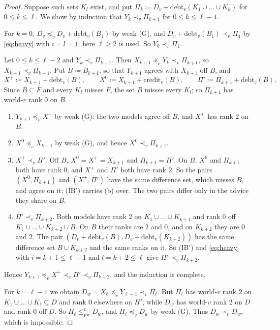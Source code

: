 \documentclass[11pt]{article}
\theoremstyle{definition}\newtheorem{definition}[theorem]{Definition}
\theoremstyle{remark}\newtheorem{remark}[theorem]{Remark}
\newcommand{\debt}{\mathrm{debt}}
\newcommand{\cred}{\mathrm{credit}}
\newcommand{\pw}{\mathrm{pw}}
\begin{document}
\begin{proof}
Suppose such sets $K_l$ exist, and put
$\Pi_k\coloneqq D_v+\debt_v(K_1\cup\dots\cup K_k)$ for $0\le k\le\ell$. We
show by induction that $Y_k\prec_v\Pi_{k+1}$ for $0\le k\le\ell-1$.

For $k=0$, $D_v\preceq_vD_v+\debt_v(B_1)$ by weak (G), and
$D_v+\debt_v(B_1)\prec_v\Pi_1$ by \eqref{eq:heavy} with $i=l=1$; here
$\ell\ge2$ is used. So $Y_0\prec_v\Pi_1$.

Let $0\le k\le\ell-2$ and $Y_k\prec_v\Pi_{k+1}$. Then
$X_{k+1}\preceq_vY_k\prec_v\Pi_{k+1}$, so $X_{k+1}\prec_v\Pi_{k+1}$. Put
$B\coloneqq B_{k+1}$, so that $Y_{k+1}$ agrees with $X_{k+1}$ off $B$, and
\[
 X^+\coloneqq X_{k+1}+\debt_v(B),\qquad
 X^0\coloneqq X_{k+1}+\cred_v(B),\qquad
 \Pi'\coloneqq\Pi_{k+1}+\debt_v(B).
\]
Since $B\subseteq F$ and every $K_l$ misses $F$, the set $B$ misses every
$K_l$; so $\Pi_{k+1}$ has world-$v$ rank $0$ on $B$.
\begin{enumerate}[label=(\alph*),leftmargin=*,itemsep=2pt]
\item $Y_{k+1}\preceq_vX^+$ by weak (G): the two models agree off $B$, and
$X^+$ has rank $2$ on $B$.
\item $X^0\preceq_vX_{k+1}$ by weak (G), and hence $X^0\prec_v\Pi_{k+1}$.
\item $X^+\prec_v\Pi'$. Off $B$, $X^0=X^+=X_{k+1}$ and $\Pi_{k+1}=\Pi'$. On
$B$, $X^0$ and $\Pi_{k+1}$ both have rank $0$, and $X^+$ and $\Pi'$ both
have rank $2$. So the pairs $(X^0,\Pi_{k+1})$ and $(X^+,\Pi')$ have the same
difference set, which misses $B$, and agree on it; (IB$'$) carries (b)
over. The two pairs differ only in the advice they share on $B$.
\item $\Pi'\prec_v\Pi_{k+2}$. Both models have rank $2$ on
$K_1\cup\dots\cup K_{k+1}$ and rank $0$ off
$K_1\cup\dots\cup K_{k+2}\cup B$. On $B$ their ranks are $2$ and $0$, and on
$K_{k+2}$ they are $0$ and $2$. The pair
$(D_v+\debt_v(B),D_v+\debt_v(K_{k+2}))$ has the same difference set
$B\cup K_{k+2}$ and the same ranks on it. So (IB$'$) and \eqref{eq:heavy}
with $i=k+1\le\ell-1$ and $l=k+2\le\ell$ give $\Pi'\prec_v\Pi_{k+2}$.
\end{enumerate}
Hence $Y_{k+1}\preceq_vX^+\prec_v\Pi'\prec_v\Pi_{k+2}$, and the induction is
complete.

For $k=\ell-1$ we obtain $D_w=X_\ell\preceq_vY_{\ell-1}\prec_v\Pi_\ell$.
But $\Pi_\ell$ has world-$v$ rank $2$ on $K_1\cup\dots\cup K_\ell\subseteq D$
and rank $0$ elsewhere on $H'$, while $D_w$ has world-$v$ rank $2$ on $D$
and rank $0$ off $D$. So $\Pi_\ell\le^v_\pw D_w$, and $\Pi_\ell\preceq_vD_w$
by weak (G). Thus $D_w\prec_vD_w$, which is impossible.
\end{proof}
\end{document}
